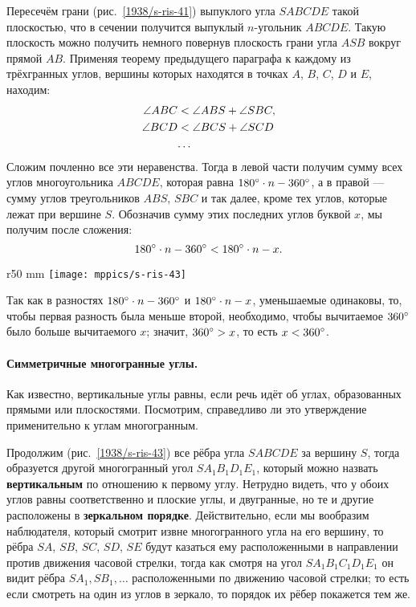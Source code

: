 Пересечём грани (рис.~\ref{1938/s-ris-41}) выпуклого угла $SABCDE$ такой плоскостью, что в сечении получится выпуклый $n$-угольник $ABCDE$.
Такую плоскость можно получить немного повернув плоскость грани угла $ASB$ вокруг прямой $AB$.
Применяя теорему предыдущего параграфа к каждому из трёхгранных углов, вершины которых находятся в точках $A$, $B$, $C$, $D$ и $E$, находим:
\begin{align*}
\angle ABC &< \angle ABS + \angle SBC,
\\
\angle BCD &< \angle BCS + \angle SCD
\\
&\text{\dots}
\end{align*}
Сложим почленно все эти неравенства.
Тогда в левой части получим сумму всех углов многоугольника $ABCDE$, которая равна $180\degree\cdot n - 360\degree$, а в правой — сумму углов треугольников $ABS$, $SBC$ и так далее, кроме тех углов, которые лежат при вершине $S$.
Обозначив сумму этих последних углов буквой $x$, мы получим после сложения:
\[180\degree\cdot n - 360\degree< 180\degree\cdot n - x.\]

\begin{wrapfigure}[15]{r}{50 mm}
\vskip-6mm
\centering
\texttt{[image: mppics/s-ris-43]}
\caption{}\label{1938/s-ris-43}
\end{wrapfigure}

Так как в разностях $180\degree\cdot n-360\degree$ и $180\degree\cdot n-x$, уменьшаемые одинаковы, то, чтобы первая разность была меньше второй, необходимо, чтобы вычитаемое $360\degree$ было больше вычитаемого $x$;
значит, $360\degree> x$, то есть $x < 360\degree$.

\paragraph{Симметричные многогранные углы.}\label{1938/s53}
Как известно, вертикальные углы равны, если речь идёт об углах, образованных прямыми или плоскостями.
Посмотрим, справедливо ли это утверждение применительно к углам многогранным.

Продолжим (рис.~\ref{1938/s-ris-43}) все рёбра угла $SABCDE$ за вершину $S$, тогда образуется другой многогранный угол $SA_1B_1D_1E_1$, который можно назвать \textbf{вертикальным} по отношению к первому углу.
Нетрудно видеть, что у обоих углов равны соответственно и плоские углы, и двугранные, но те и другие расположены в \textbf{зеркальном порядке}.
Действительно, если мы вообразим наблюдателя, который смотрит извне многогранного угла на его вершину, то рёбра $SA$, $SB$, $SC$, $SD$, $SE$ будут казаться ему расположенными в направлении против движения часовой стрелки, тогда как смотря на угол $SA_1B_1C_1D_1E_1$ он видит рёбра $SA_1, SB_1,\dots$ расположенными по движению часовой стрелки;
то есть если смотреть на один из углов в зеркало, то порядок их рёбер покажется тем же.


